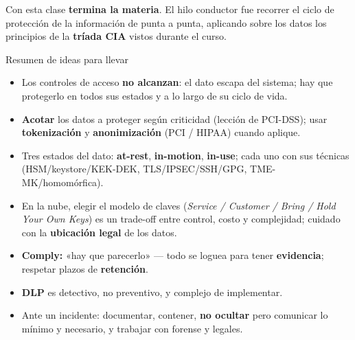 \documentclass[11pt,a4paper]{article}
\begin{document}
Con esta clase \textbf{termina la materia}. El hilo conductor fue recorrer el ciclo de
protección de la información de punta a punta, aplicando sobre los datos los principios de la
\textbf{tríada CIA} vistos durante el curso.

\begin{center}
\end{center}

\begin{defbox}{Resumen de ideas para llevar}
\begin{itemize}[leftmargin=1.4em,itemsep=2pt,topsep=2pt]
  \item Los controles de acceso \textbf{no alcanzan}: el dato escapa del sistema; hay que
        protegerlo en todos sus estados y a lo largo de su ciclo de vida.
  \item \textbf{Acotar} los datos a proteger según criticidad (lección de PCI-DSS); usar
        \textbf{tokenización} y \textbf{anonimización} (PCI / HIPAA) cuando aplique.
  \item Tres estados del dato: \textbf{at-rest}, \textbf{in-motion}, \textbf{in-use}; cada uno
        con sus técnicas (HSM/keystore/KEK-DEK, TLS/IPSEC/SSH/GPG, TME-MK/homomórfica).
  \item En la nube, elegir el modelo de claves (\emph{Service / Customer / Bring / Hold Your
        Own Keys}) es un trade-off entre control, costo y complejidad; cuidado con la
        \textbf{ubicación legal} de los datos.
  \item \textbf{Comply:} «hay que parecerlo» — todo se loguea para tener \textbf{evidencia};
        respetar plazos de \textbf{retención}.
  \item \textbf{DLP} es detectivo, no preventivo, y complejo de implementar.
  \item Ante un incidente: documentar, contener, \textbf{no ocultar} pero comunicar lo
        mínimo y necesario, y trabajar con forense y legales.
\end{itemize}
\end{defbox}
\end{document}
